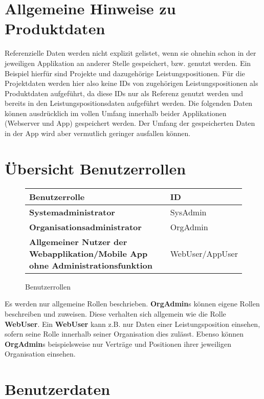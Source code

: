 \section{Allgemeine Hinweise zu Produktdaten}

Referenzielle Daten werden nicht explizit gelistet, wenn sie ohnehin schon in der jeweiligen Applikation an anderer Stelle gespeichert, bzw. genutzt werden.
Ein Beispiel hierfür sind Projekte und dazugehörige Leistungspositionen. Für die Projektdaten werden hier also keine IDs von zugehörigen Leistungspositionen
als Produktdaten aufgeführt, da diese IDs nur als Referenz genutzt werden und bereits in den Leistungspositionsdaten aufgeführt werden.
Die folgenden Daten können ausdrücklich im vollen Umfang innerhalb beider Applikationen (Webserver und App) gespeichert werden. Der Umfang der gespeicherten Daten in der App wird aber vermutlich geringer ausfallen können.

\section{Übersicht Benutzerrollen}

\begin{figure}[h]
	\centering
	\begin{tabularx}{\textwidth}{| X | X |}
        \hline
		\textbf{Benutzerrolle} & \textbf{ID} \\ \hline \hline
		\textbf{Systemadministrator} & SysAdmin \\ \hline
		\textbf{Organisationsadministrator} & OrgAdmin \\ \hline
        \textbf{Allgemeiner Nutzer der Webapplikation/Mobile App ohne Administrationsfunktion} & WebUser/AppUser \\ \hline
	\end{tabularx}
	\caption{Benutzerrollen}
	\label{fig:Benutzerrollen}
\end{figure}

\begin{flushleft}
Es werden nur allgemeine Rollen beschrieben. \textbf{OrgAdmin}s können eigene Rollen beschreiben und zuweisen. Diese verhalten sich allgemein wie die Rolle \textbf{WebUser}.
Ein \textbf{WebUser} kann z.B. nur Daten einer Leistungsposition einsehen, sofern seine Rolle innerhalb seiner Organisation dies zulässt. Ebenso können \textbf{OrgAdmin}s beispielsweise nur Verträge und
Positionen ihrer jeweiligen Organisation einsehen.
\end{flushleft}

\section{Benutzerdaten}

